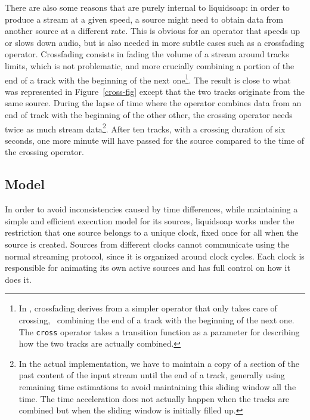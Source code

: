 There are also some reasons that are purely internal to liquidsoap:
in order to produce a stream at a given speed,
a source might need to obtain data from another source at
a different rate. This is obvious for an operator that speeds up or
slows down audio, but is also needed in more subtle cases
such as a crossfading operator.
Crossfading consists in fading the volume of a stream around tracks
limits, which is not problematic, and more crucially combining a portion
of the end of a track with the beginning of the next one\footnote{
  In \liquidsoap, crossfading derives from a simpler operator that
  only takes care of crossing, \ie\ combining the end of a track
  with the beginning of the next one. The \texttt{cross} operator
  takes a transition function as a parameter for describing how
  the two tracks are actually combined.
}.
The result is close to what was represented in Figure~\ref{cross-fig}
except that the two tracks originate from the same source.
During the lapse of time where the operator combines
data from an end of track with the beginning of the other other,
the crossing operator needs twice as much stream data\footnote{
  In the actual implementation, we have to
  maintain a copy of a section of the past content
  of the input stream until the end of a track,
  generally using remaining time estimations to avoid maintaining
  this sliding window all the time.
  The time acceleration does not actually happen
  when the tracks are combined but when the sliding window
  is initially filled up.
}.
After ten tracks,
with a crossing duration of six seconds, one more minute will have
passed for the source compared to the time of the crossing operator.

\subsection{Model}

In order to avoid inconsistencies caused by time differences,
while maintaining a simple and efficient execution model for
its sources, liquidsoap works under the restriction that
one source belongs to a unique clock,
fixed once for all when the source is created.
Sources from different clocks cannot communicate using the normal
streaming protocol, since it is organized around clock cycles.
Each clock is responsible for animating its own active sources
and has full control on how it does it.

